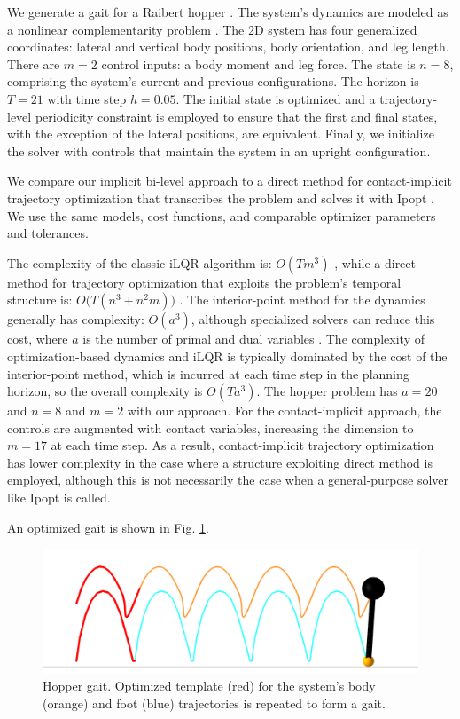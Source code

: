 We generate a gait for a Raibert hopper \cite{raibert1989dynamically}. The system's dynamics are modeled as a nonlinear complementarity problem \cite{lecleach2021fast}. The 2D system has four generalized coordinates: lateral and vertical body positions, body orientation, and leg length. There are $m = 2$ control inputs: a body moment and leg force. The state is $n = 8$, comprising the system's current and previous configurations. The  horizon is $T = 21$ with time step $h = 0.05$. The initial state is optimized and a trajectory-level periodicity constraint is employed to ensure that the first and final states, with the exception of the lateral positions, are equivalent. Finally, we initialize the solver with controls that maintain the system in an upright configuration.

We compare our implicit bi-level approach to a direct method for contact-implicit trajectory optimization \cite{manchester2020variational} that transcribes the problem and solves it with Ipopt \cite{wachter2006implementation}. We use the same models, cost functions, and comparable optimizer parameters and tolerances. 

The complexity of the classic iLQR algorithm is: $O(T m^3)$ \cite{tassa2007receding}, while a direct method for trajectory optimization that exploits the problem's temporal structure is: $O\Big(T (n^3 + n^2 m) \Big)$ \cite{wang2009fast}. The interior-point method for the dynamics generally has complexity: $O(a^3)$, although specialized solvers can reduce this cost, where $a$ is the number of primal and dual variables \cite{nocedal2006numerical}. The complexity of optimization-based dynamics and iLQR is typically dominated by the cost of the interior-point method, which is incurred at each time step in the planning horizon, so the overall complexity is $O(T a^3)$. The hopper problem has $a = 20$ and $n = 8$ and $m = 2$ with our approach. For the contact-implicit approach, the controls are augmented with contact variables, increasing the dimension to $m = 17$ at each time step. As a result, contact-implicit trajectory optimization has lower complexity in the case where a structure exploiting direct method is employed, although this is not necessarily the case when a general-purpose solver like Ipopt is called.

An optimized gait is shown in Fig. \ref{od_hopper_gait}. 

\begin{figure}[H]
	\centering
	\includegraphics[width=.4\textwidth]{optimization_dynamics/hopper_gait_1.png}
	\caption[Hopper gait]{Hopper gait. Optimized template (red) for the system's body (orange) and foot (blue) trajectories is repeated to form a gait.}
	\label{od_hopper_gait}
\end{figure}


